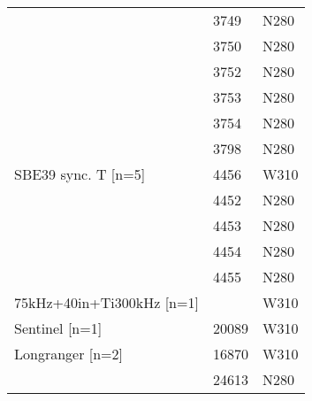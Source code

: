 \documentclass{article}
\begin{document}
\begin{table}[!htbp]
\begin{tabular}{lll}
 & 3749 & N280 \\
 & 3750 & N280 \\
 & 3752 & N280 \\
 & 3753 & N280 \\
 & 3754 & N280 \\
 & 3798 & N280 \\
SBE39 sync. T [n=5] & 4456 & W310 \\
 & 4452 & N280 \\
 & 4453 & N280 \\
 & 4454 & N280 \\
 & 4455 & N280 \\
75kHz+40in+Ti300kHz [n=1] &  & W310 \\
Sentinel [n=1] & 20089 & W310 \\
Longranger [n=2] & 16870 & W310 \\
 & 24613 & N280 \\
\bottomrule
\end{tabular}
\end{table}
\end{document}

